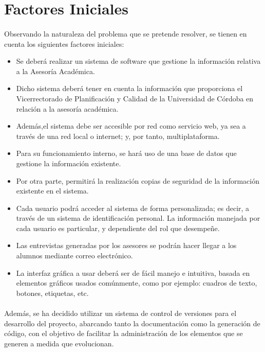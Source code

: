 \section{Factores Iniciales}

\paragraph{}Observando la naturaleza del problema que se pretende resolver, se
tienen en cuenta los siguientes factores iniciales:

\begin{itemize}
   \item Se deberá realizar un sistema de software que gestione la información
   relativa a la Asesoría Académica.
   \item Dicho sistema deberá tener en cuenta la información que proporciona el
   Vicerrectorado de Planificación y Calidad de la Universidad de Córdoba en
   relación a la asesoría académica.
   \item Además,el sistema debe ser accesible por red como servicio web, ya sea
   a través de una red local o internet; y, por tanto, multiplataforma.
   \item Para su funcionamiento interno, se hará uso de una base de datos que
   gestione la información existente.
   \item Por otra parte, permitirá la realización copias de seguridad de la
   información existente en el sistema.
   \item Cada usuario podrá acceder al sistema de forma personalizada; es decir,
   a través de un sistema de identificación personal. La información manejada
   por cada usuario es particular, y dependiente del rol que desempeñe.
   \item Las entrevistas generadas por los asesores se podrán hacer llegar a los
   alumnos mediante correo electrónico.
   \item La interfaz gráfica a usar deberá ser de fácil manejo e intuitiva,
   basada en elementos gráficos usados comúnmente, como por ejemplo: cuadros de
   texto, botones, etiquetas, etc.
\end{itemize}

\paragraph{}Además, se ha decidido utilizar un sistema de control de versiones
   para el desarrollo del proyecto, abarcando tanto la documentación como la
   generación de código, con el objetivo de facilitar la administración de los
   elementos que se generen a medida que evolucionan.

